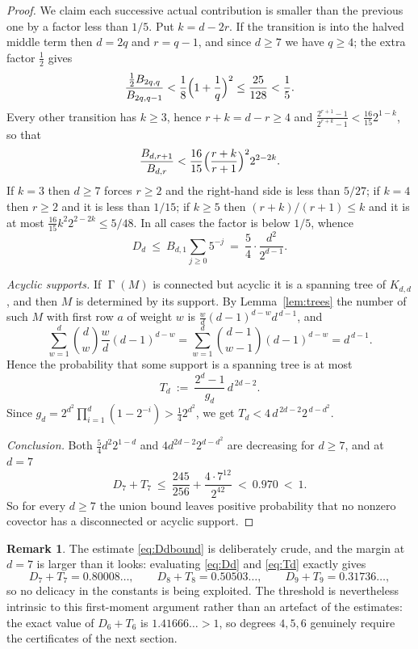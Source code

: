 \documentclass[11pt,reqno]{amsart}
\theoremstyle{plain}
\theoremstyle{definition}
\newtheorem{remark}[theorem]{Remark}
\DeclareMathOperator{\Gam}{\Gamma}
\begin{document}
\begin{proof}
We claim each successive actual contribution is smaller than the previous one by a factor less than $1/5$. Put $k=d-2r$. If the transition is into the halved middle term then $d=2q$ and $r=q-1$, and since $d\ge 7$ we have $q\ge 4$; the extra factor $\tfrac12$ gives
\[
\frac{\tfrac12 B_{2q,q}}{B_{2q,q-1}}<\frac{1}{8}\Bigl(1+\frac{1}{q}\Bigr)^{2}\le\frac{25}{128}<\frac{1}{5}.
\]
Every other transition has $k\ge 3$, hence $r+k=d-r\ge 4$ and $\frac{2^{r+1}-1}{2^{r+k}-1}<\frac{16}{15}2^{1-k}$, so that
\[
\frac{B_{d,r+1}}{B_{d,r}}<\frac{16}{15}\Bigl(\frac{r+k}{r+1}\Bigr)^{2}2^{2-2k}.
\]
If $k=3$ then $d\ge 7$ forces $r\ge 2$ and the right-hand side is less than $5/27$; if $k=4$ then $r\ge 2$ and it is less than $1/15$; if $k\ge 5$ then $(r+k)/(r+1)\le k$ and it is at most $\tfrac{16}{15}k^{2}2^{2-2k}\le 5/48$. In all cases the factor is below $1/5$, whence
\begin{equation}\label{eq:Ddbound}
D_{d}\ \le\ B_{d,1}\sum_{j\ge 0}5^{-j}\ =\ \frac{5}{4}\cdot\frac{d^{2}}{2^{d-1}}.
\end{equation}

\smallskip
\noindent\emph{Acyclic supports.} If $\Gam(M)$ is connected but acyclic it is a spanning tree of $K_{d,d}$, and then $M$ is determined by its support. By Lemma~\ref{lem:trees} the number of such $M$ with first row $a$ of weight $w$ is $\tfrac{w}{d}(d-1)^{d-w}d^{\,d-1}$, and
\[
\sum_{w=1}^{d}\binom{d}{w}\frac{w}{d}(d-1)^{d-w}=\sum_{w=1}^{d}\binom{d-1}{w-1}(d-1)^{d-w}=d^{\,d-1}.
\]
Hence the probability that some support is a spanning tree is at most
\begin{equation}\label{eq:Td}
T_{d}\ :=\ \frac{2^{d}-1}{g_{d}}\,d^{\,2d-2}.
\end{equation}
Since $g_{d}=2^{d^{2}}\prod_{i=1}^{d}(1-2^{-i})>\tfrac14 2^{d^{2}}$, we get $T_{d}<4\,d^{\,2d-2}2^{\,d-d^{2}}$.

\smallskip
\noindent\emph{Conclusion.} Both $\tfrac54 d^{2}2^{1-d}$ and $4d^{2d-2}2^{d-d^{2}}$ are decreasing for $d\ge 7$, and at $d=7$
\[
D_{7}+T_{7}\ \le\ \frac{245}{256}+\frac{4\cdot 7^{12}}{2^{42}}\ <\ 0.970\ <\ 1 .
\]
So for every $d\ge 7$ the union bound leaves positive probability that no nonzero covector has a disconnected or acyclic support.
\end{proof}

\begin{remark}\label{rem:margin}
The estimate \eqref{eq:Ddbound} is deliberately crude, and the margin at $d=7$ is larger than it looks: evaluating \eqref{eq:Dd} and \eqref{eq:Td} exactly gives
\[
D_{7}+T_{7}=0.80008\ldots,\qquad D_{8}+T_{8}=0.50503\ldots,\qquad D_{9}+T_{9}=0.31736\ldots,
\]
so no delicacy in the constants is being exploited. The threshold is nevertheless intrinsic to this first-moment argument rather than an artefact of the estimates: the exact value of $D_{6}+T_{6}$ is $1.41666\ldots>1$, so degrees $4,5,6$ genuinely require the certificates of the next section.
\end{remark}
\end{document}
